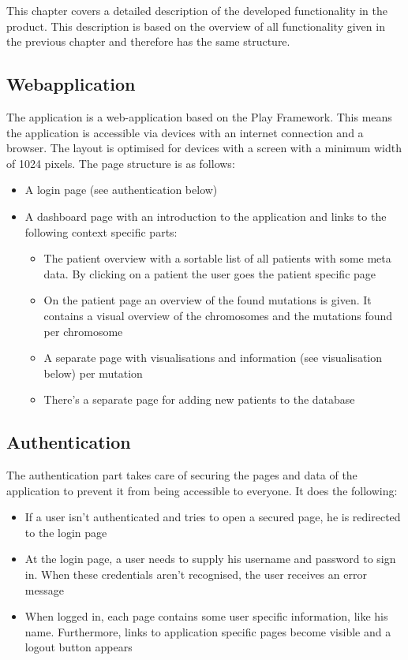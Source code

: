 This chapter covers a detailed description of the developed functionality in the product. This description is based  on the overview of all functionality given in the previous chapter and therefore has the same structure.

\subsection{Webapplication}

The application is a web-application based on the Play Framework. This means the application is accessible via devices with an internet connection and a browser. The layout is optimised for devices with a screen with a minimum width of 1024 pixels. The page structure is as follows:

\begin{itemize}
  \item A login page (see authentication below)
  \item A dashboard page with an introduction to the application and links to the following context specific parts:
  \begin{itemize}
     \item The patient overview with a sortable list of all patients with some meta data. By clicking on a patient the user goes the patient specific page
     \item On the patient page an overview of the found mutations is given. It contains a visual overview of the chromosomes and the mutations found per chromosome
     \item A separate page with visualisations and information (see visualisation below) per mutation
     \item There's a separate page for adding new patients to the database
  \end{itemize}
\end{itemize}

\subsection{Authentication}

The authentication part takes care of securing the pages and data of the application to prevent it from being accessible to everyone. It does the following:

\begin{itemize}
  \item If a user isn't authenticated and tries to open a secured page, he is redirected to the login page
  \item At the login page, a user needs to supply his username and password to sign in. When these credentials aren't recognised, the user receives an error message
  \item When logged in, each page contains some user specific information, like his name. Furthermore, links to application specific pages become visible and a logout button appears
\end{itemize}

